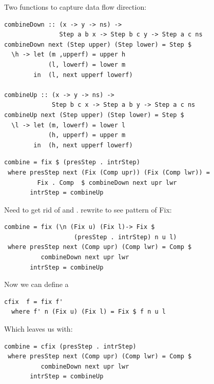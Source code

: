 \documentclass[preprint,natbib]{sigplanconf}
\begin{document}
Two functions to capture data flow direction:

\begin{small} %
\begin{verbatim}
combineDown :: (x -> y -> ns) ->
               Step a b x -> Step b c y -> Step a c ns
combineDown next (Step upper) (Step lower) = Step $
  \h -> let (m ,upperf) = upper h
            (l, lowerf) = lower m
        in  (l, next upperf lowerf)   

combineUp :: (x -> y -> ns) -> 
             Step b c x -> Step a b y -> Step a c ns
combineUp next (Step upper) (Step lower) = Step $ 
  \l -> let (m, lowerf) = lower l
            (h, upperf) = upper m
        in  (h, next upperf lowerf)   
\end{verbatim}%
\end{small}

\begin{small}%
\begin{verbatim}
combine = fix $ (presStep . intrStep) 
 where presStep next (Fix (Comp upr)) (Fix (Comp lwr)) =
         Fix . Comp  $ combineDown next upr lwr  
       intrStep = combineUp
\end{verbatim}%
\end{small}

Need to get rid of  and . rewrite to see pattern of Fix:

\begin{small}%
\begin{verbatim}
combine = fix (\n (Fix u) (Fix l)-> Fix $
                   (presStep . intrStep) n u l) 
 where presStep next (Comp upr) (Comp lwr) = Comp $ 
          combineDown next upr lwr  
       intrStep = combineUp
\end{verbatim}
\end{small}

Now we can define a 
\begin{small}
\begin{verbatim}
cfix  f = fix f' 
  where f' n (Fix u) (Fix l) = Fix $ f n u l
\end{verbatim}%
\end{small}

Which leaves us with:

\begin{small}%
\begin{verbatim}
combine = cfix (presStep . intrStep)
 where presStep next (Comp upr) (Comp lwr) = Comp $ 
          combineDown next upr lwr  
       intrStep = combineUp
\end{verbatim}%
\end{small}
\end{document}

